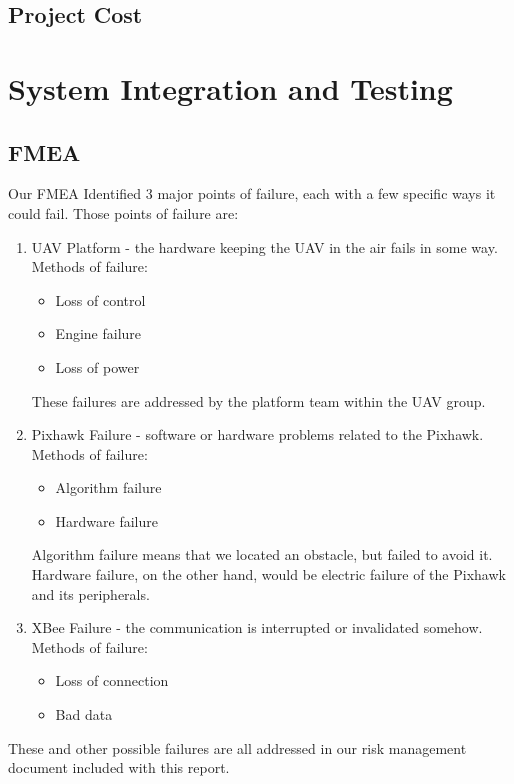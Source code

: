 \documentclass[12pt]{article}
\begin{document}
\subsection{Project Cost}

\section{System Integration and Testing}
\subsection{FMEA}
Our FMEA Identified 3 major points of failure, each with a few specific ways it could fail. Those points of failure are:
\begin{enumerate}
\item UAV Platform - the hardware keeping the UAV in the air fails in some way. Methods of failure:
  \begin{itemize}
  \item Loss of control
  \item Engine failure
  \item Loss of power
  \end{itemize}
These failures are addressed by the platform team within the UAV group.
\item Pixhawk Failure - software or hardware problems related to the Pixhawk. Methods of failure:
  \begin{itemize}
  \item Algorithm failure
  \item Hardware failure
  \end{itemize}
Algorithm failure means that we located an obstacle, but failed to avoid it. Hardware failure, on the other hand, would be electric failure of the Pixhawk and its peripherals.
\item XBee Failure - the communication is interrupted or invalidated somehow. Methods of failure:
  \begin{itemize}
  \item Loss of connection
  \item Bad data
  \end{itemize}
\end{enumerate}
These and other possible failures are all addressed in our risk management document included with this report.
\end{document}
